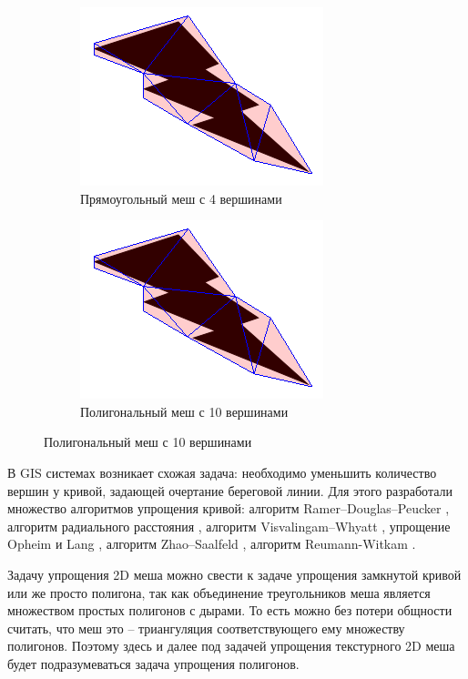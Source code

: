 \documentclass{fefu_thesis/cls/fefu}
\begin{document}
    \begin{figure}[H]
        \centering
        \begin{subfigure}[c]{.49\linewidth}
            \includegraphics{images/Thunder_approx.png}
            \caption{Прямоугольный меш с 4 вершинами}
        \end{subfigure}
        \begin{subfigure}[c]{.49\linewidth}
            \includegraphics{images/Thunder_approx.png}
            \caption{Полигональный меш с 10 вершинами}
        \end{subfigure}
    \end{figure}

    В GIS системах возникает схожая задача: необходимо уменьшить количество вершин у кривой, задающей очертание береговой линии. Для этого разработали множество алгоритмов упрощения кривой: алгоритм Ramer–Douglas–Peucker \cite{Ramer}\cite{DouglasPeucker}, алгоритм радиального расстояния \cite{PolylineSimplification}, алгоритм Visvalingam–Whyatt \cite{VisvalingamWhyatt}, упрощение Opheim \cite{Opheim} и Lang \cite{Lang}, алгоритм Zhao–Saalfeld \cite{ZhaoSaalfeld}, алгоритм Reumann-Witkam \cite{ReumannWitkam}.

    Задачу упрощения 2D меша можно свести к задаче упрощения замкнутой кривой или же просто полигона, так как объединение треугольников меша является множеством простых полигонов с дырами. То есть можно без потери общности считать, что меш это -- триангуляция соответствующего ему множеству полигонов. Поэтому здесь и далее под задачей упрощения текстурного 2D меша будет подразумеваться задача упрощения полигонов.
\end{document}
